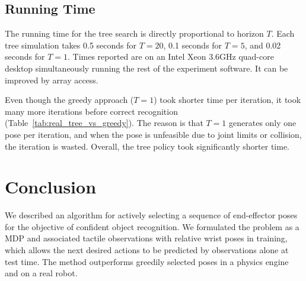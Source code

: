 \documentclass[letterpaper, 10 pt, conference]{ieeeconf}  %
\begin{document}



\subsection{Running Time}
\label{sec:running_time}

The running time for the tree search is directly proportional to horizon $T$. Each tree simulation takes 0.5 seconds for $T=20$, 0.1 seconds for $T=5$, and 0.02 seconds for $T=1$.
Times reported are on an Intel Xeon 3.6GHz quad-core desktop simultaneously running the rest of the experiment software.
It can be improved by array access.

Even though the greedy approach ($T=1$) took shorter time per iteration, it took many more iterations before correct recognition (Table~\ref{tab:real_tree_vs_greedy}).
The reason is that $T=1$ generates only one pose per iteration, and when the pose is unfeasible due to joint limits or collision, the iteration is wasted. 
Overall, the tree policy took significantly shorter time.


\section{Conclusion}

We described an algorithm for actively selecting a sequence of end-effector poses for the objective of confident object recognition. We formulated the problem as a MDP and associated tactile observations with relative wrist poses in training, which allows the next desired actions to be predicted by observations alone at test time. The method outperforms greedily selected poses in a physics engine and on a real robot.
\end{document}
